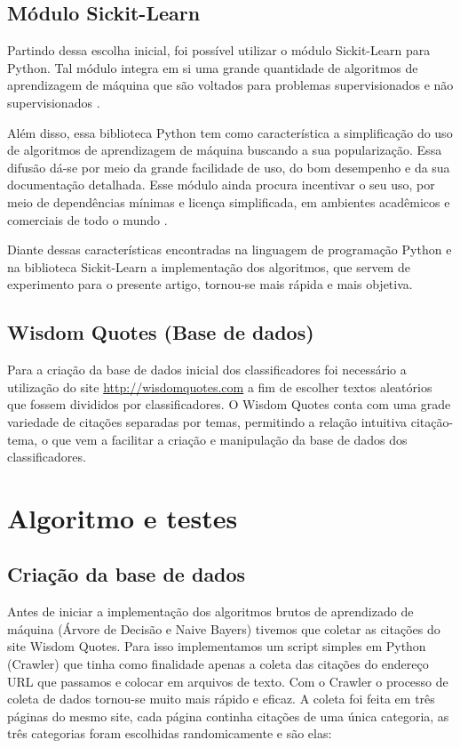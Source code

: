 \documentclass[preprint,12pt,times]{elsarticle}
\begin{document}
	\subsection{Módulo Sickit-Learn}
	Partindo dessa escolha inicial, foi possível utilizar o módulo Sickit-Learn para Python. Tal módulo integra em si uma grande quantidade de algoritmos de aprendizagem de máquina que são voltados para problemas supervisionados e não supervisionados \cite{scikit-learn}. 
	
	Além disso, essa biblioteca Python tem como característica a simplificação do uso de algoritmos de aprendizagem de máquina buscando a sua popularização. Essa difusão dá-se por meio da grande facilidade de uso, do bom desempenho e da sua documentação detalhada. Esse módulo ainda procura incentivar o seu uso, por meio de dependências mínimas e licença simplificada, em ambientes acadêmicos e comerciais de todo o mundo \cite{scikit-learn}.
	
	Diante dessas características encontradas na linguagem de programação Python e na biblioteca Sickit-Learn a implementação dos algoritmos, que servem de experimento para o presente artigo, tornou-se mais rápida e mais objetiva.
	
	\subsection{Wisdom Quotes (Base de dados)}
	Para a criação da base de dados inicial dos classificadores foi necessário a utilização do site \url{http://wisdomquotes.com} a fim de escolher textos aleatórios que fossem divididos por classificadores. O Wisdom Quotes conta com uma grade variedade de citações separadas por temas, permitindo a relação intuitiva citação-tema, o que vem a facilitar a criação e manipulação da base de dados dos classificadores.
	
	\section{Algoritmo e testes}
	\label{Algoritmo e testes}
	
	\subsection{Criação da base de dados}
	
	Antes de iniciar a implementação dos algoritmos brutos de aprendizado de máquina (Árvore de Decisão e Naive Bayers) tivemos que coletar as citações do site Wisdom Quotes. Para isso implementamos um script simples em Python (Crawler) que tinha como finalidade apenas a coleta das citações do endereço URL que passamos e colocar em arquivos de texto. Com o Crawler o processo de coleta de dados tornou-se muito mais rápido e eficaz.
	A coleta foi feita em três páginas do mesmo site, cada página continha citações de uma única categoria, as três categorias foram escolhidas randomicamente e são elas:
	
\end{document}
